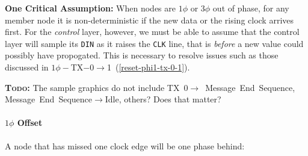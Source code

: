 \medskip
\noindent
\begin{framed}
  \label{reset-assumption}
  \textbf{One Critical Assumption:} When nodes are $1\phi$ or $3\phi$ out of
  phase, for any member node it is non-deterministic if the new data or the
  rising clock arrives first. For the {\em control} layer, however, we must
  be able to assume that the control layer will sample its {\tt DIN} as it
  raises the {\tt CLK} line, that is {\em before} a new value could possibly
  have propogated.  This is necessary to resolve issues such as those discussed
  in $1\phi-$TX$-0\rightarrow$1~(\ref{reset-phi1-tx-0-1}).
\end{framed}

\medskip
\textbf{\textsc{Todo:}} The sample graphics do not include
TX~0$\rightarrow$~Message~End~Sequence, Message~End~Sequence$\rightarrow$Idle,
others? Does that matter?

\paragraph{$1\phi$ Offset}
A node that has missed one clock edge will be one phase behind:

